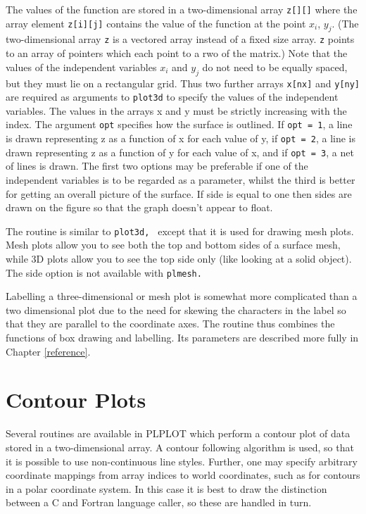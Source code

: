 The values of the function are stored in a two-dimensional array {\tt z[][]}
where the array element {\tt z[i][j]} contains the value of the function at
the point $x_i$, $y_j$.  (The two-dimensional array {\tt z} is a vectored
array instead of a fixed size array.  {\tt z} points to an array of pointers
which each point to a rwo of the matrix.) Note that the values of the
independent variables $x_i$ and $y_j$ do not need to be equally spaced, but
they must lie on a rectangular grid.  Thus two further arrays {\tt x[nx]}
and {\tt y[ny]} are required as arguments to {\tt plot3d} to specify the
values of the independent variables.  The values in the arrays x and y must
be strictly increasing with the index.  The argument {\tt opt} specifies how
the surface is outlined.  If {\tt opt = 1}, a line is drawn representing z as
a function of x for each value of y, if {\tt opt = 2}, a line is drawn
representing z as a function of y for each value of x, and if {\tt opt = 3}, a
net of lines is drawn.  The first two options may be preferable if one of
the independent variables is to be regarded as a parameter, whilst the third
is better for getting an overall picture of the surface.  If side is equal
to one then sides are drawn on the figure so that the graph doesn't appear
to float.

The routine  is similar to {\tt plot3d, } except that it is
used for drawing mesh plots. Mesh plots allow you to see both the top and
bottom sides of a surface mesh, while 3D plots allow you to see the top
side only (like looking at a solid object). The side option is not
available with {\tt plmesh.}

Labelling a three-dimensional or mesh plot is somewhat more complicated than
a two dimensional plot due to the need for skewing the characters in the
label so that they are parallel to the coordinate axes.  The routine
 thus combines the functions of box drawing and labelling.  Its
parameters are described more fully in Chapter \ref{reference}.


\section {Contour Plots}\label{contour}

Several routines are available in PLPLOT which perform a contour plot of
data stored in a two-dimensional array.  A contour following algorithm is
used, so that it is possible to use non-continuous line styles.  Further, 
one may specify arbitrary coordinate mappings from array indices to world
coordinates, such as for contours in a polar coordinate system.  In this
case it is best to draw the distinction between a C and Fortran language
caller, so these are handled in turn. 

